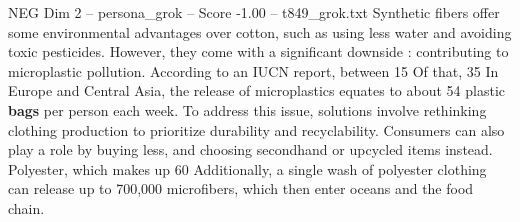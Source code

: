 \begin{textsample}{NEG Dim 2 – persona\_grok – Score -1.00 – t849\_grok.txt}  \label{ex:f2_neg_024}
Synthetic fibers offer some environmental advantages over cotton, such as using less water and avoiding toxic pesticides.
However, they come with a significant downside : contributing to microplastic pollution.
According to an IUCN report, between 15 %
Of that, 35 %
In Europe and Central Asia, the release of microplastics equates to about 54 plastic \textbf{bags} per person each week.
To address this issue, solutions involve rethinking clothing production to prioritize durability and recyclability.
Consumers can also play a role by buying less, and choosing secondhand or upcycled items instead.
Polyester, which makes up 60 %
Additionally, a single wash of polyester clothing can release up to 700,000 microfibers, which then enter oceans and the food chain.

\end{textsample}
